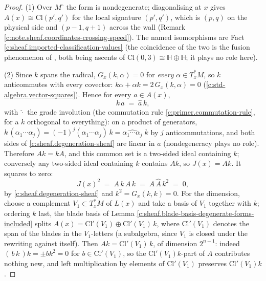 \documentclass[11pt]{article}
\theoremstyle{definition}
\theoremstyle{plain}
\providecommand{\Cl}{}\renewcommand{\Cl}{\mathrm{Cl}}
\providecommand{\HH}{}\renewcommand{\HH}{\mathbb{H}}
\providecommand{\Mo}{}\renewcommand{\Mo}{M^{\circ}}
\providecommand{\shL}{}\renewcommand{\shL}{L}
\begin{document}
\begin{proof}
(1) Over $\Mo$ the form is nondegenerate; diagonalising at $x$ gives $A(x) \cong \Cl(p', q')$ for the local signature $(p', q')$, which is $(p,q)$ on the physical side and $(p{-}1, q{+}1)$ across the wall (Remark \ref{c:note.sheaf.coordinates-crossing-speed}). The named isomorphisms are Fact \ref{c:sheaf.imported-classification-values} (the coincidence of the two is the fusion phenomenon of \cite[Ex.~5.10]{ButlerT1}, both being ascents of $\Cl(0,3) \cong \HH \oplus \HH$; it plays no role here).

(2) Since $k$ spans the radical, $G_x(k, \alpha) = 0$ for \emph{every} $\alpha \in T^*_xM$, so $k$ anticommutes with every covector: $k\alpha + \alpha k = 2\,G_x(k,\alpha) = 0$ (\ref{c:std-algebra.vector-squares}). Hence for every $a \in A(x)$,
\begin{equation}\label{eq:kcommutation}
k\,a \;=\; \hat{a}\,k ,
\end{equation}
with $\hat{\cdot}$ the grade involution (the commutation rule \ref{c:primer.commutation-rule}, for a $k$ orthogonal to everything): on a product of generators, $k\,(\alpha_1 \cdots \alpha_j) = (-1)^j (\alpha_1 \cdots \alpha_j)\, k = \widehat{\alpha_1 \cdots \alpha_j}\; k$ by $j$ anticommutations, and both sides of \ref{c:sheaf.degeneration-sheaf} are linear in $a$ (nondegeneracy plays no role). Therefore $A k = k A$, and this common set is a two-sided ideal containing $k$; conversely any two-sided ideal containing $k$ contains $Ak$, so $J(x) = Ak$. It squares to zero:
\[
J(x)^2 \;=\; A\,k\,A\,k \;=\; A\,\hat{A}\,k^2 \;=\; 0 ,
\]
by \ref{c:sheaf.degeneration-sheaf} and $k^2 = G_x(k,k) = 0$. For the dimension, choose a complement $V_1 \subset T^*_xM$ of $\shL(x)$ and take a basis of $V_1$ together with $k$; ordering $k$ last, the blade basis of Lemma \ref{c:sheaf.blade-basis-degenerate-forms-included} splits $A(x) = \Cl'(V_1) \oplus \Cl'(V_1)\,k$, where $\Cl'(V_1)$ denotes the span of the blades in the $V_1$-letters (a subalgebra, since $V_1$ is closed under the rewriting against itself). Then $Ak = \Cl'(V_1)\,k$, of dimension $2^{n-1}$: indeed $(\,b\,k\,)k = \pm b k^2 = 0$ for $b \in \Cl'(V_1)$, so the $\Cl'(V_1)k$-part of $A$ contributes nothing new, and left multiplication by elements of $\Cl'(V_1)$ preserves $\Cl'(V_1)k$.


\end{proof}
\end{document}

